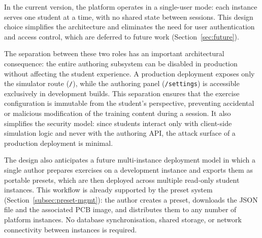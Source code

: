 In the current version, the platform operates in a single-user mode: each instance serves one student at a time, with no shared state between sessions. This design choice simplifies the architecture and eliminates the need for user authentication and access control, which are deferred to future work (Section~\ref{sec:future}).

The separation between these two roles has an important architectural consequence: the entire authoring subsystem can be disabled in production without affecting the student experience. A production deployment exposes only the simulator route (\texttt{/}), while the authoring panel (\texttt{/settings}) is accessible exclusively in development builds. This separation ensures that the exercise configuration is immutable from the student's perspective, preventing accidental or malicious modification of the training content during a session. It also simplifies the security model: since students interact only with client-side simulation logic and never with the authoring API, the attack surface of a production deployment is minimal.

The design also anticipates a future multi-instance deployment model in which a single author prepares exercises on a development instance and exports them as portable presets, which are then deployed across multiple read-only student instances. This workflow is already supported by the preset system (Section~\ref{subsec:preset-mgmt}): the author creates a preset, downloads the JSON file and the associated PCB image, and distributes them to any number of platform instances. No database synchronisation, shared storage, or network connectivity between instances is required.

